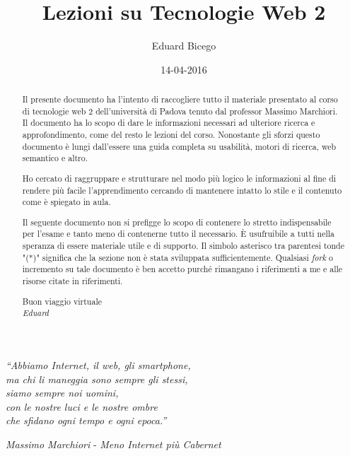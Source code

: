 \documentclass[a4paper,11pt]{report}
\begin{document}
\title{Lezioni su Tecnologie Web 2}
\author{Eduard Bicego}
\date{14-04-2016}

\maketitle



\begin{abstract}
	Il presente documento ha l'intento di raccogliere tutto il materiale presentato al corso di tecnologie web 2 dell'università di Padova tenuto dal professor Massimo Marchiori. Il documento ha lo scopo di dare le informazioni necessari ad ulteriore ricerca e approfondimento, come del resto le lezioni del corso. Nonostante gli sforzi questo documento è lungi dall'essere una guida completa su usabilità, motori di ricerca, web semantico e altro. \par
	
	Ho cercato di raggruppare e strutturare nel modo più logico le informazioni al fine di rendere più facile l'apprendimento cercando di mantenere intatto lo stile e il contenuto come è spiegato in aula. \par
	
	Il seguente documento non si prefigge lo scopo di contenere lo stretto indispensabile per l'esame e tanto meno di contenerne tutto il necessario. 
	È usufruibile a tutti nella speranza di essere materiale utile e di supporto. Il simbolo asterisco tra parentesi tonde "(*)" significa che la sezione non è stata sviluppata sufficientemente. Qualsiasi \emph{fork} o incremento su tale documento è ben accetto purché rimangano i riferimenti a me e alle risorse citate in riferimenti.
	\begin{flushright}
		Buon viaggio virtuale \\
		\emph{Eduard}
	\end{flushright}
	
	
\end{abstract}

\hypersetup{linkcolor=black}
\tableofcontents
\listoffigures

\newpage
	\begin{center}
		\emph{``Abbiamo Internet, il web, gli smartphone,\\
		 ma chi li maneggia sono sempre gli stessi,\\
		  siamo sempre noi uomini, \\
		  con le nostre luci e le nostre ombre \\
		  che sfidano ogni tempo e ogni epoca.''\\}
	\end{center}
	\begin{flushright}
		\emph{Massimo Marchiori} - \emph{Meno Internet più Cabernet}	
	\end{flushright}
\end{document}
